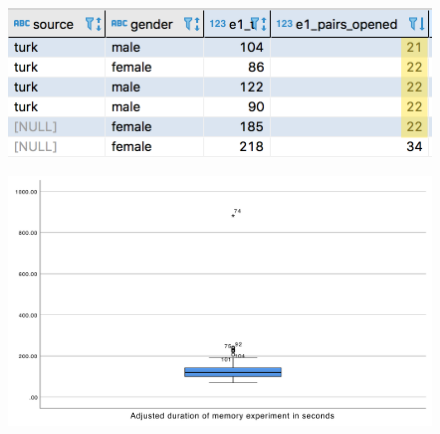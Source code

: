 \begin{figure}[ht!]
	\centering
	\begin{minipage}{.4\textwidth}
		\centering
		\includegraphics[width=1\linewidth]{graphics/MemoryOutlier1}
		\label{fig:test1}
	\end{minipage}%
	\begin{minipage}{.6\textwidth}
		\centering
		\includegraphics[width=1\linewidth]{graphics/memoryOutlier2}
		\label{fig:test2}
	\end{minipage}
\end{figure}



